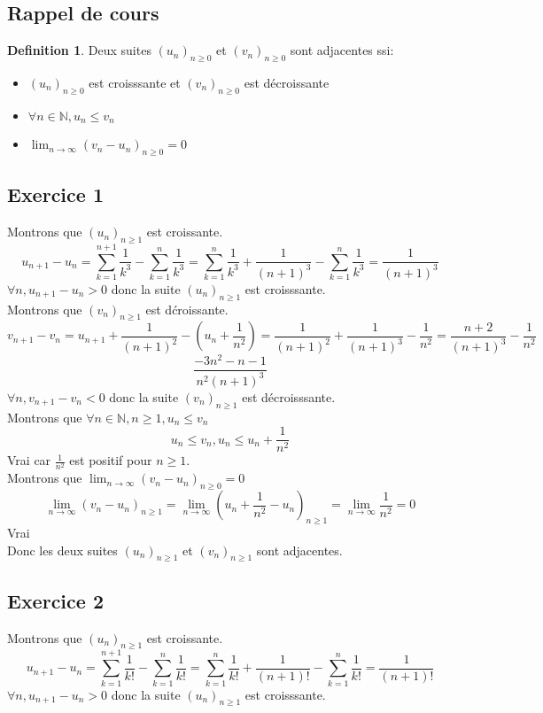 \documentclass[]{book}
\theoremstyle{definition}
\newtheorem{defn}{Definition}
\newcommand{\bb}[1]{\mathbb{#1}}
\newcommand{\N}{\bb{N}}
\begin{document}
\subsection*{Rappel de cours}
\begin{defn}
Deux suites $(u_n)_{n\geq0}$ et $(v_n)_{n\geq0}$ sont adjacentes ssi:
\begin{itemize}
\item $(u_n)_{n\geq0}$ est croisssante et $(v_n)_{n\geq0}$ est d\'ecroissante
\item $\forall n \in \N, u_n \leq v_n$
\item $\lim_{n \to \infty}(v_n-u_n)_{n\geq0} = 0$
\end{itemize}  
\end{defn}


\newpage
\subsection*{Exercice 1}
Montrons que $(u_n)_{n\geq1}$ est croissante. 
$$u_{n+1} - u_{n} = \sum_{k=1}^{n+1}\frac{1}{k^3} - \sum_{k=1}^{n}\frac{1}{k^3} = \sum_{k=1}^{n}\frac{1}{k^3} + \frac{1}{(n+1)^3} - \sum_{k=1}^{n}\frac{1}{k^3} =  \frac{1}{(n+1)^3}$$
$\forall n, u_{n+1} - u_{n} > 0$ donc la suite $(u_n)_{n\geq1}$ est croisssante.\\

Montrons que $(v_n)_{n\geq1}$ est d\'croissante. 
$$v_{n+1} - v_{n} = u_{n+1}+\frac{1}{(n+1)^2} - (u_{n}+\frac{1}{n^2}) = \frac{1}{(n+1)^2} + \frac{1}{(n+1)^3} - \frac{1}{n^2} = \frac{n+2}{(n+1)^3} - \frac{1}{n^2}$$
$$\frac{-3n^2-n-1}{n^2(n+1)^3}$$
$\forall n, v_{n+1} - v_{n} < 0$ donc la suite $(v_n)_{n\geq1}$ est d\'ecroisssante.\\

Montrons que $\forall n \in \N, n \geq 1, u_n \leq v_n$
$$u_n \leq v_n, u_n \leq u_n + \frac{1}{n^2}$$
Vrai car $\frac{1}{n^2}$ est positif pour $n \geq 1$.\\

Montrons que $\lim_{n \to \infty}(v_n-u_n)_{n\geq0} = 0$
$$\lim_{n \to \infty}(v_n-u_n)_{n\geq1} = \lim_{n \to \infty}(u_n+\frac{1}{n^2}-u_n)_{n\geq1} = \lim_{n \to \infty}\frac{1}{n^2} = 0$$
Vrai\\

Donc les deux suites $(u_n)_{n\geq1}$ et $(v_n)_{n\geq1}$ sont adjacentes.


\subsection*{Exercice 2}
Montrons que $(u_n)_{n\geq1}$ est croissante. 
$$u_{n+1} - u_{n} = \sum_{k=1}^{n+1}\frac{1}{k!} - \sum_{k=1}^{n}\frac{1}{k!} = \sum_{k=1}^{n}\frac{1}{k!} + \frac{1}{(n+1)!} - \sum_{k=1}^{n}\frac{1}{k!} =  \frac{1}{(n+1)!}$$
$\forall n, u_{n+1} - u_{n} > 0$ donc la suite $(u_n)_{n\geq1}$ est croisssante.\\
\end{document}
